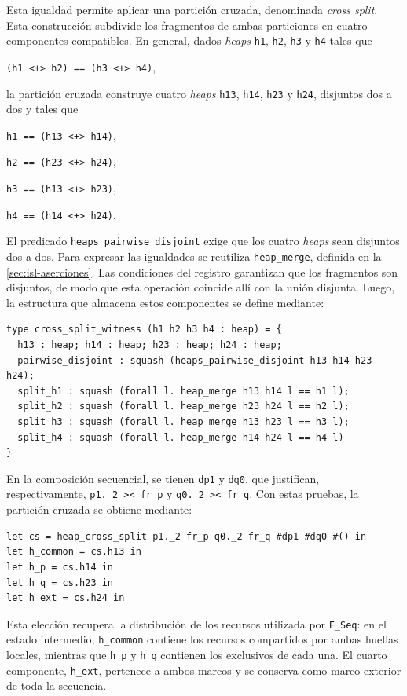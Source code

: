 \documentclass[a4paper,	11pt]{report}
\begin{document}
Esta igualdad permite aplicar una partición cruzada,
denominada \emph{cross split}.
Esta construcción subdivide los fragmentos de ambas particiones en cuatro componentes compatibles.
En general,
dados \emph{heaps} \lstinline|h1|,
\lstinline|h2|, \lstinline|h3| y \lstinline|h4| tales que
\begin{center}
\lstinline|(h1 <+> h2) == (h3 <+> h4)|,
\end{center}
la partición cruzada construye cuatro \emph{heaps} \lstinline|h13|,
\lstinline|h14|, \lstinline|h23| y \lstinline|h24|,
disjuntos dos a dos y tales que
\begin{center}
\lstinline|h1 == (h13 <+> h14)|,

\lstinline|h2 == (h23 <+> h24)|,

\lstinline|h3 == (h13 <+> h23)|,

\lstinline|h4 == (h14 <+> h24)|.
\end{center}
El predicado \lstinline|heaps_pairwise_disjoint| exige que los cuatro \emph{heaps} sean disjuntos dos a dos.
Para expresar las igualdades se reutiliza \lstinline|heap_merge|,
definida en la \autoref{sec:isl-aserciones}.
Las condiciones del registro garantizan que los fragmentos son disjuntos,
de modo que esta operación coincide allí con la unión disjunta.
Luego,
la estructura que almacena estos componentes se define mediante:

\begin{lstlisting}
type cross_split_witness (h1 h2 h3 h4 : heap) = {
  h13 : heap; h14 : heap; h23 : heap; h24 : heap;
  pairwise_disjoint : squash (heaps_pairwise_disjoint h13 h14 h23 h24);
  split_h1 : squash (forall l. heap_merge h13 h14 l == h1 l);
  split_h2 : squash (forall l. heap_merge h23 h24 l == h2 l);
  split_h3 : squash (forall l. heap_merge h13 h23 l == h3 l);
  split_h4 : squash (forall l. heap_merge h14 h24 l == h4 l)
}
\end{lstlisting}

En la composición secuencial,
se tienen \lstinline|dp1| y \lstinline|dq0|,
que justifican, respectivamente,
\lstinline|p1._2 >< fr_p| y \lstinline|q0._2 >< fr_q|.
Con estas pruebas,
la partición cruzada se obtiene mediante:

\begin{lstlisting}
let cs = heap_cross_split p1._2 fr_p q0._2 fr_q #dp1 #dq0 #() in
let h_common = cs.h13 in
let h_p = cs.h14 in
let h_q = cs.h23 in
let h_ext = cs.h24 in
\end{lstlisting}
Esta elección recupera la distribución de los recursos utilizada por \lstinline|F_Seq|:
en el estado intermedio,
\lstinline|h_common| contiene los recursos compartidos por ambas huellas locales,
mientras que \lstinline|h_p| y \lstinline|h_q| contienen los exclusivos de cada una.
El cuarto componente,
\lstinline|h_ext|,
pertenece a ambos marcos y se conserva como marco exterior de toda la secuencia.
\end{document}

